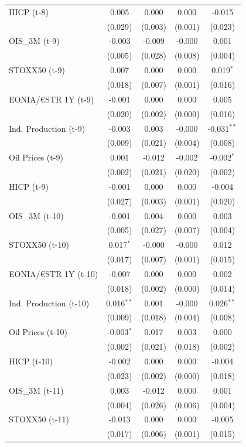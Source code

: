 \begin{longtable}[t]{lcccc}
HICP (t-8) & 0.005 & 0.000 & 0.000 & -0.015\\
 & (0.029) & (0.003) & (0.001) & (0.023)\\
OIS\_3M (t-9) & -0.003 & -0.009 & -0.000 & 0.001\\
 & (0.005) & (0.028) & (0.008) & (0.004)\\
STOXX50 (t-9) & 0.007 & 0.000 & 0.000 & 0.019$^{*}$\\
 & (0.018) & (0.007) & (0.001) & (0.016)\\
EONIA/€STR 1Y (t-9) & -0.001 & 0.000 & 0.000 & 0.005\\
 & (0.020) & (0.002) & (0.000) & (0.016)\\
Ind. Production (t-9) & -0.003 & 0.003 & -0.000 & -0.031$^{**}$\\
 & (0.009) & (0.021) & (0.004) & (0.008)\\
Oil Prices (t-9) & 0.001 & -0.012 & -0.002 & -0.002$^{*}$\\
 & (0.002) & (0.021) & (0.020) & (0.002)\\
HICP (t-9) & -0.001 & 0.000 & 0.000 & -0.004\\
 & (0.027) & (0.003) & (0.001) & (0.020)\\
OIS\_3M (t-10) & -0.001 & 0.004 & 0.000 & 0.003\\
 & (0.005) & (0.027) & (0.007) & (0.004)\\
STOXX50 (t-10) & 0.017$^{*}$ & -0.000 & -0.000 & 0.012\\
 & (0.017) & (0.007) & (0.001) & (0.015)\\
EONIA/€STR 1Y (t-10) & -0.007 & 0.000 & 0.000 & 0.002\\
 & (0.018) & (0.002) & (0.000) & (0.014)\\
Ind. Production (t-10) & 0.016$^{**}$ & 0.001 & -0.000 & 0.026$^{**}$\\
 & (0.009) & (0.018) & (0.004) & (0.008)\\
Oil Prices (t-10) & -0.003$^{*}$ & 0.017 & 0.003 & 0.000\\
 & (0.002) & (0.021) & (0.018) & (0.002)\\
HICP (t-10) & -0.002 & 0.000 & 0.000 & -0.004\\
 & (0.023) & (0.002) & (0.000) & (0.018)\\
OIS\_3M (t-11) & 0.003 & -0.012 & 0.000 & 0.001\\
 & (0.004) & (0.026) & (0.006) & (0.004)\\
STOXX50 (t-11) & -0.013 & 0.000 & 0.000 & -0.005\\
 & (0.017) & (0.006) & (0.001) & (0.015)\\

\end{longtable}
